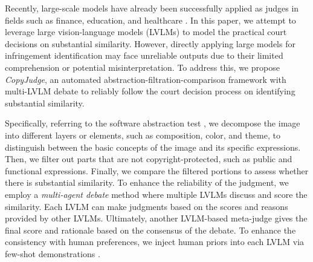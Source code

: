 Recently, large-scale models have already been successfully applied as judges in fields such as finance, education, and healthcare \cite{gu2024survey, li2024llms, zhuge2024agent}. In this paper, we attempt to leverage large vision-language models (LVLMs) to model the practical court decisions on substantial similarity. However, directly applying large models for infringement identification may face unreliable outputs due to their limited comprehension or potential misinterpretation. To address this, we propose \textit{CopyJudge}, an automated abstraction-filtration-comparison framework with multi-LVLM debate to reliably follow the court decision process on identifying substantial similarity. 

Specifically, referring to the software abstraction test \cite{abramson2002promoting}, we decompose the image into different layers or elements, such as composition, color, and theme, to distinguish between the basic concepts of the image and its specific expressions. Then, we filter out parts that are not copyright-protected, such as public and functional expressions. Finally, we compare the filtered portions to assess whether there is substantial similarity. To enhance the reliability of the judgment, we employ a \textit{multi-agent debate} \cite{du2023improving, chan2023chateval} method where multiple LVLMs discuss and score the similarity. Each LVLM can make judgments based on the scores and reasons provided by other LVLMs. Ultimately, another LVLM-based meta-judge gives the final score and rationale based on the consensus of the debate. To enhance the consistency with human preferences, we inject human priors into each LVLM via few-shot demonstrations \cite{agarwal2024many}. 


